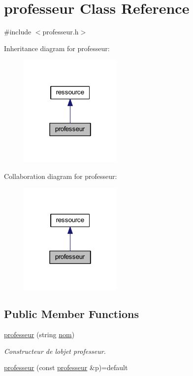 \hypertarget{classprofesseur}{}\section{professeur Class Reference}
\label{classprofesseur}


{\ttfamily \#include $<$professeur.\+h$>$}



Inheritance diagram for professeur\+:\nopagebreak
\begin{figure}[H]
\begin{center}
\leavevmode
\includegraphics[width=142pt]{classprofesseur__inherit__graph}
\end{center}
\end{figure}


Collaboration diagram for professeur\+:\nopagebreak
\begin{figure}[H]
\begin{center}
\leavevmode
\includegraphics[width=142pt]{classprofesseur__coll__graph}
\end{center}
\end{figure}
\subsection*{Public Member Functions}
\begin{DoxyCompactItemize}
\item 
\hyperlink{classprofesseur_a3cc95d3ac471e633c318782228a8682e}{professeur} (string \hyperlink{classressource_aff712b6d732b3f4091dd29f4349aba85}{nom})
\begin{DoxyCompactList}\small\item\em Constructeur de l\textquotesingle{}objet professeur. \end{DoxyCompactList}\item 
\hyperlink{classprofesseur_a652526233e701be639ecb40a73161039}{professeur} (const \hyperlink{classprofesseur}{professeur} \&p)=default
\end{DoxyCompactItemize}
